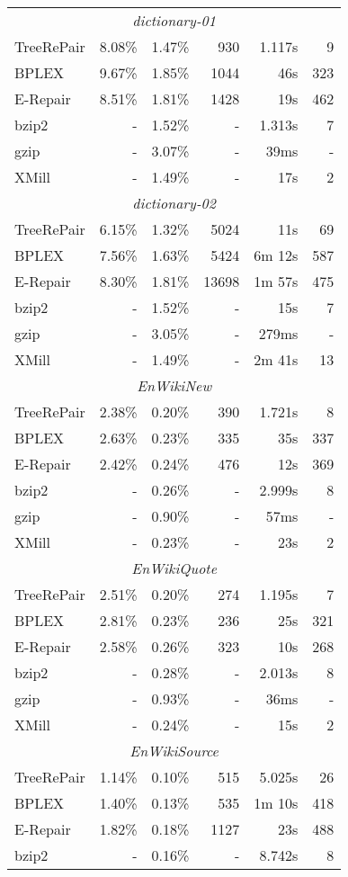 \documentclass[12pt]{llncs}
\begin{document}
\begin{longtable}{lrrrrr}
			\midrule\multicolumn{6}{c}{\emph{dictionary-01}}\\*
			TreeRePair&8.08\%&1.47\%&930&1.117s&9\\*
			BPLEX&9.67\%&1.85\%&1044&46s&323\\*
			E-Repair&8.51\%&1.81\%&1428&19s&462\\*
			bzip2&-&1.52\%&-&1.313s&7\\*
			gzip&-&3.07\%&-&39ms&-\\*
			XMill&-&1.49\%&-&17s&2\\
			\midrule\multicolumn{6}{c}{\emph{dictionary-02}}\\*
			TreeRePair&6.15\%&1.32\%&5024&11s&69\\*
			BPLEX&7.56\%&1.63\%&5424&6m 12s&587\\*
			E-Repair&8.30\%&1.81\%&13698&1m 57s&475\\*
			bzip2&-&1.52\%&-&15s&7\\*
			gzip&-&3.05\%&-&279ms&-\\*
			XMill&-&1.49\%&-&2m 41s&13\\
			\midrule\multicolumn{6}{c}{\emph{EnWikiNew}}\\*
			TreeRePair&2.38\%&0.20\%&390&1.721s&8\\*
			BPLEX&2.63\%&0.23\%&335&35s&337\\*
			E-Repair&2.42\%&0.24\%&476&12s&369\\*
			bzip2&-&0.26\%&-&2.999s&8\\*
			gzip&-&0.90\%&-&57ms&-\\*
			XMill&-&0.23\%&-&23s&2\\
			\midrule\multicolumn{6}{c}{\emph{EnWikiQuote}}\\*
			TreeRePair&2.51\%&0.20\%&274&1.195s&7\\*
			BPLEX&2.81\%&0.23\%&236&25s&321\\*
			E-Repair&2.58\%&0.26\%&323&10s&268\\*
			bzip2&-&0.28\%&-&2.013s&8\\*
			gzip&-&0.93\%&-&36ms&-\\*
			XMill&-&0.24\%&-&15s&2\\
			\midrule\multicolumn{6}{c}{\emph{EnWikiSource}}\\*
			TreeRePair&1.14\%&0.10\%&515&5.025s&26\\*
			BPLEX&1.40\%&0.13\%&535&1m 10s&418\\*
			E-Repair&1.82\%&0.18\%&1127&23s&488\\*
			bzip2&-&0.16\%&-&8.742s&8\\*

\end{longtable}
\end{document}
